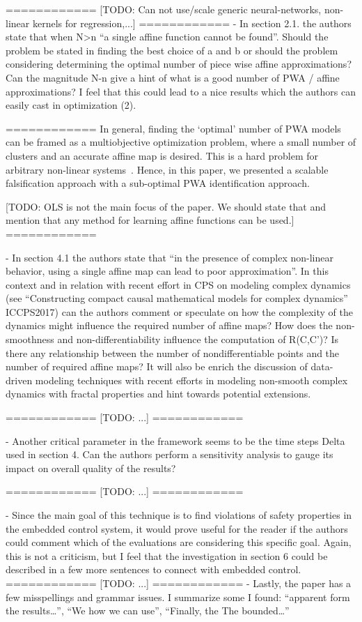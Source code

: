    ============
   [TODO: Can not use/scale generic neural-networks, non-linear
   kernels for regression,...]
   ============
- In section 2.1. the authors state that when N>n “a single affine function
cannot be found”. Should the problem be stated in finding the best choice of
a and b or should the problem considering determining the optimal number of
piece wise affine approximations? Can the magnitude N-n give a hint of what is
a good number of PWA / affine approximations? I feel that this could lead to a
nice results which the authors can easily cast in optimization (2).

   ============
   In general, finding the `optimal' number of PWA models can be
   framed as a multiobjective optimization problem, where a small
   number of clusters and an accurate affine map is desired. This is a
   hard problem for arbitrary non-linear systems~\cite{[TODO]}.
   Hence, in this paper, we presented a scalable falsification approach
   with a sub-optimal PWA identification approach.

   [TODO: OLS is not the main focus of the paper. We should state that
   and mention that any method for learning affine functions can be
   used.]
   ============

- In section 4.1 the authors state that “in the presence of complex
non-linear behavior, using a single affine map can lead to poor
approximation”. In this context and in relation with recent effort in CPS on
modeling complex dynamics (see “Constructing compact causal mathematical
models for complex dynamics” ICCPS2017) can the authors comment or speculate
on how the complexity of the dynamics might influence the required number of
affine maps? How does the non-smoothness and non-differentiability influence
the computation of R(C,C’)? Is there any relationship between the number of
nondifferentiable points and the number of required affine maps? It will also
be enrich the discussion of data-driven modeling techniques with recent efforts
in modeling non-smooth complex dynamics with fractal properties and hint
towards potential extensions.


   ============
   [TODO: ...]
   ============

- Another critical parameter in the framework seems to be the time steps Delta
used in section 4. Can the authors perform a sensitivity analysis to gauge its
impact on overall quality of the results?

   ============
   [TODO: ...]
   ============

- Since the main goal of this technique is to find violations of safety
properties in the embedded control system, it would prove useful for the reader
if the authors could comment which of the evaluations are considering this
specific goal. Again, this is not a criticism, but I feel that the
investigation in section 6 could be described in a few more sentences to
connect with embedded control.
   ============
   [TODO: ...]
   ============
- Lastly, the paper has a few misspellings and grammar issues. I summarize some
I found: “apparent form the results…”, “We how we can use”,
“Finally, the The bounded…”

